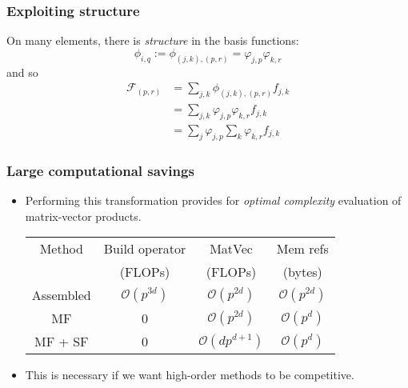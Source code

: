\documentclass[presentation]{beamer}
\begin{document}
\begin{frame}
  \frametitle{Exploiting structure}
  On many elements, there is \emph{structure} in the basis functions:
  \begin{equation*}
    \phi_{i,q} := \phi_{(j,k),(p,r)} = \varphi_{j,p}\varphi_{k,r}
  \end{equation*}
  and so
  \begin{align*}
    \mathcal{F}_{(p,r)} &= \sum_{j,k} \phi_{(j,k),(p,r)} f_{j,k} \\
                        &= \sum_{j,k} \varphi_{j,p}\varphi_{k,r} f_{j,k} \\
                        &= \sum_j \varphi_{j,p} \sum_k \varphi_{k,r} f_{j,k}
  \end{align*}
\end{frame}

\begin{frame}
  \frametitle{Large computational savings}
  \begin{itemize}
  \item Performing this transformation provides for \emph{optimal
      complexity} evaluation of matrix-vector products.

    \begin{center}
      \begin{tabular}{c|c|c|c}
        Method    & Build operator        & MatVec                  & Mem refs
        \\
                  & (FLOPs)               & (FLOPs)                 & (bytes)               \\
        \hline
        Assembled & $\mathcal{O}(p^{3d})$ & $\mathcal{O}(p^{2d})$   & $\mathcal{O}(p^{2d})$ \\
        MF        & 0                     & $\mathcal{O}(p^{2d})$   & $\mathcal{O}(p^d)$    \\
        MF + SF   & 0                     & $\mathcal{O}(dp^{d+1})$ & $\mathcal{O}(p^d)$
      \end{tabular}
    \end{center}
    
  \item This is necessary if we want high-order methods to be competitive.
  \end{itemize}
  
\end{frame}
\end{document}
